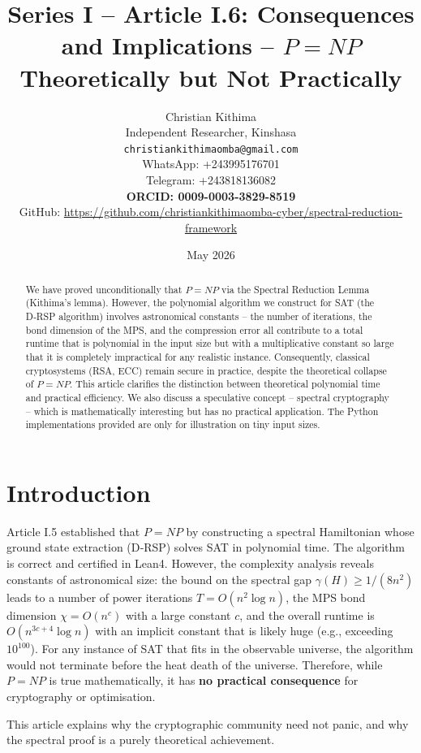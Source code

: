 \documentclass[11pt,a4paper]{article}
\title{Series I – Article I.6: Consequences and Implications – \(P = NP\) Theoretically but Not Practically}
\author{Christian Kithima \\
Independent Researcher, Kinshasa \\
\texttt{christiankithimaomba@gmail.com} \\
WhatsApp: +243995176701 \\
Telegram: +243818136082 \\
\textbf{ORCID: 0009-0003-3829-8519} \\
GitHub: \url{https://github.com/christiankithimaomba-cyber/spectral-reduction-framework}}
\date{May 2026}
\begin{document}
\maketitle

\begin{abstract}
We have proved unconditionally that \(P = NP\) via the Spectral Reduction Lemma (Kithima's lemma). However, the polynomial algorithm we construct for SAT (the D‑RSP algorithm) involves astronomical constants – the number of iterations, the bond dimension of the MPS, and the compression error all contribute to a total runtime that is polynomial in the input size but with a multiplicative constant so large that it is completely impractical for any realistic instance. Consequently, classical cryptosystems (RSA, ECC) remain secure in practice, despite the theoretical collapse of \(P = NP\). This article clarifies the distinction between theoretical polynomial time and practical efficiency. We also discuss a speculative concept – spectral cryptography – which is mathematically interesting but has no practical application. The Python implementations provided are only for illustration on tiny input sizes.
\end{abstract}

\tableofcontents

\section{Introduction}

Article I.5 established that \(P = NP\) by constructing a spectral Hamiltonian whose ground state extraction (D‑RSP) solves SAT in polynomial time. The algorithm is correct and certified in Lean4. However, the complexity analysis reveals constants of astronomical size: the bound on the spectral gap \(\gamma(H) \ge 1/(8n^2)\) leads to a number of power iterations \(T = O(n^2 \log n)\), the MPS bond dimension \(\chi = O(n^c)\) with a large constant \(c\), and the overall runtime is \(O(n^{3c+4} \log n)\) with an implicit constant that is likely huge (e.g., exceeding \(10^{100}\)). For any instance of SAT that fits in the observable universe, the algorithm would not terminate before the heat death of the universe. Therefore, while \(P = NP\) is true mathematically, it has \textbf{no practical consequence} for cryptography or optimisation.

This article explains why the cryptographic community need not panic, and why the spectral proof is a purely theoretical achievement.
\end{document}
